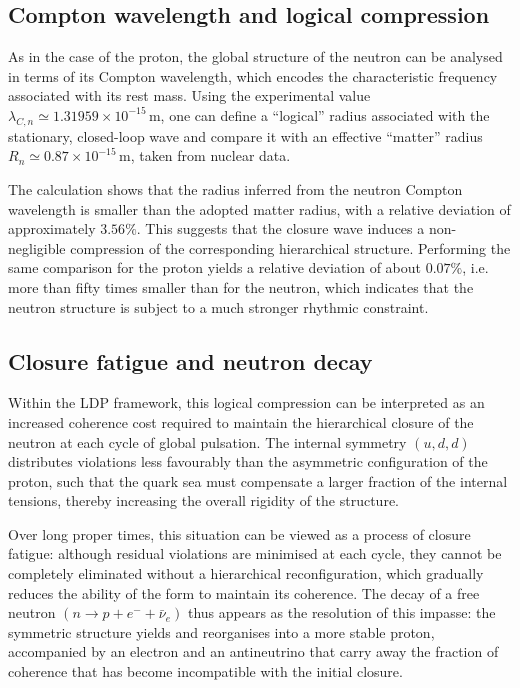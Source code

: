 \documentclass[11pt,a4paper]{article}
\begin{document}
\subsection{Compton wavelength and logical compression}
As in the case of the proton, the global structure of the neutron can be analysed in terms of its Compton wavelength, which encodes the characteristic frequency associated with its rest mass. Using the experimental value \(\lambda_{C,n} \simeq 1.31959 \times 10^{-15}\,\mathrm{m}\), one can define a “logical” radius associated with the stationary, closed-loop wave and compare it with an effective “matter” radius \(R_{n} \simeq 0.87 \times 10^{-15}\,\mathrm{m}\), taken from nuclear data.

The calculation shows that the radius inferred from the neutron Compton wavelength is smaller than the adopted matter radius, with a relative deviation of approximately \(3.56\%\). This suggests that the closure wave induces a non-negligible compression of the corresponding hierarchical structure. Performing the same comparison for the proton yields a relative deviation of about \(0.07\%\), i.e. more than fifty times smaller than for the neutron, which indicates that the neutron structure is subject to a much stronger rhythmic constraint.

\subsection{Closure fatigue and neutron decay}
Within the LDP framework, this logical compression can be interpreted as an increased coherence cost required to maintain the hierarchical closure of the neutron at each cycle of global pulsation. The internal symmetry \((u,d,d)\) distributes violations less favourably than the asymmetric configuration of the proton, such that the quark sea must compensate a larger fraction of the internal tensions, thereby increasing the overall rigidity of the structure.

Over long proper times, this situation can be viewed as a process of closure fatigue: although residual violations are minimised at each cycle, they cannot be completely eliminated without a hierarchical reconfiguration, which gradually reduces the ability of the form to maintain its coherence. The decay of a free neutron \((n \rightarrow p + e^{-} + \bar{\nu}_{e})\) thus appears as the resolution of this impasse: the symmetric structure yields and reorganises into a more stable proton, accompanied by an electron and an antineutrino that carry away the fraction of coherence that has become incompatible with the initial closure.
\end{document}
